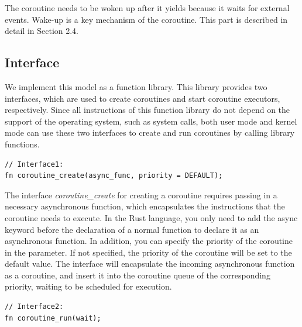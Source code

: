 \documentclass[10pt]{article}
\begin{document}
The coroutine needs to be woken up after it yields because it waits for external events. Wake-up is a key mechanism of the coroutine. This part is described in detail in Section 2.4.


\subsection{Interface}
We implement this model as a function library. This library provides two interfaces, which are used to create coroutines and start coroutine executors, respectively. Since all instructions of this function library do not depend on the support of the operating system, such as system calls, both user mode and kernel mode can use these two interfaces to create and run coroutines by calling library functions.


\begin{lstlisting}
// Interface1:
fn coroutine_create(async_func, priority = DEFAULT);
\end{lstlisting}

The interface \textit{coroutine\_create} for creating a coroutine requires passing in a necessary asynchronous function, which encapsulates the instructions that the coroutine needs to execute. In the Rust language, you only need to add the async keyword before the declaration of a normal function to declare it as an asynchronous function. In addition, you can specify the priority of the coroutine in the parameter. If not specified, the priority of the coroutine will be set to the default value. The interface will encapsulate the incoming asynchronous function as a coroutine, and insert it into the coroutine queue of the corresponding priority, waiting to be scheduled for execution.

\begin{lstlisting}
// Interface2:
fn coroutine_run(wait);
\end{lstlisting}
\end{document}
